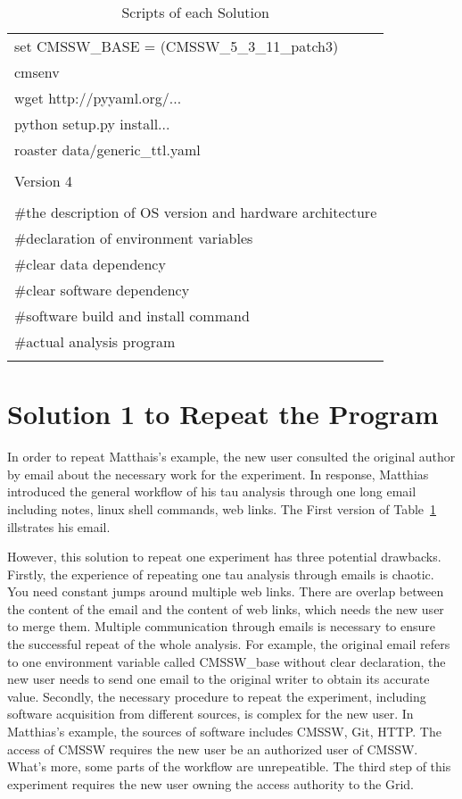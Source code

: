 \documentclass{acm_proc_article-sp}
\begin{document}
\begin{table}
\begin{tabular}{|l|}
        set CMSSW\_BASE = (CMSSW\_5\_3\_11\_patch3) \\ 
        cmsenv \\
        wget http://pyyaml.org/... \\
        python setup.py install... \\
        roaster data/generic\_ttl.yaml \\
        \\ \hline
        Version 4\\ \hline
        \\
        \#the description of OS version and hardware architecture \\
        \#declaration of environment variables\\
        \#clear data dependency\\
        \#clear software dependency\\
        \#software build and install command\\
        \#actual analysis program\\ 
        \\ \hline
    \end{tabular}
    \caption{Scripts of each Solution}
    \label{table:scripts}
\end{table}

\section{Solution 1 to Repeat the Program}
In order to repeat Matthais's example, the new user consulted the original author by email about the necessary work for the experiment. In response, Matthias introduced the general workflow of his tau analysis through one long email including notes, linux shell commands, web links. The First version of Table~\ref{table:scripts} illstrates his email.

However, this solution to repeat one experiment has three potential drawbacks. Firstly, the experience of repeating one tau analysis through emails is chaotic. You need constant jumps around multiple web links. There are overlap between the content of the email and the content of web links, which needs the new user to merge them. Multiple communication through emails is necessary to ensure the successful repeat of the whole analysis. For example, the original email refers to one environment variable called CMSSW\_base without clear declaration, the new user needs to send one email to the original writer to obtain its accurate value. Secondly, the necessary procedure to repeat the experiment, including software acquisition from different sources, is complex for the new user. In Matthias's example, the sources of software includes CMSSW, Git, HTTP. The access of CMSSW requires the new user be an authorized user of CMSSW. What's more, some parts of the workflow are unrepeatible. The third step of this experiment requires the new user owning the access authority to the Grid. 
\end{document}

